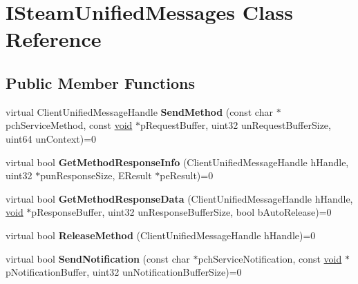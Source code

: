 \hypertarget{classISteamUnifiedMessages}{}\section{I\+Steam\+Unified\+Messages Class Reference}
\label{classISteamUnifiedMessages}
\subsection*{Public Member Functions}
\begin{DoxyCompactItemize}
\item 
\hypertarget{classISteamUnifiedMessages_a555de624350230b3293e707b2ec2a3c7}{}virtual Client\+Unified\+Message\+Handle {\bfseries Send\+Method} (const char $\ast$pch\+Service\+Method, const \hyperlink{SDL__audio_8h_a52835ae37c4bb905b903cbaf5d04b05f}{void} $\ast$p\+Request\+Buffer, uint32 un\+Request\+Buffer\+Size, uint64 un\+Context)=0\label{classISteamUnifiedMessages_a555de624350230b3293e707b2ec2a3c7}

\item 
\hypertarget{classISteamUnifiedMessages_a7923af78997437cfe9f4d817e4202676}{}virtual bool {\bfseries Get\+Method\+Response\+Info} (Client\+Unified\+Message\+Handle h\+Handle, uint32 $\ast$pun\+Response\+Size, E\+Result $\ast$pe\+Result)=0\label{classISteamUnifiedMessages_a7923af78997437cfe9f4d817e4202676}

\item 
\hypertarget{classISteamUnifiedMessages_ac86c79fcd0b915c9c53e439465a01630}{}virtual bool {\bfseries Get\+Method\+Response\+Data} (Client\+Unified\+Message\+Handle h\+Handle, \hyperlink{SDL__audio_8h_a52835ae37c4bb905b903cbaf5d04b05f}{void} $\ast$p\+Response\+Buffer, uint32 un\+Response\+Buffer\+Size, bool b\+Auto\+Release)=0\label{classISteamUnifiedMessages_ac86c79fcd0b915c9c53e439465a01630}

\item 
\hypertarget{classISteamUnifiedMessages_ac421c5bede8ca1584edb180f847efe48}{}virtual bool {\bfseries Release\+Method} (Client\+Unified\+Message\+Handle h\+Handle)=0\label{classISteamUnifiedMessages_ac421c5bede8ca1584edb180f847efe48}

\item 
\hypertarget{classISteamUnifiedMessages_a5ae1153298d137900122426dbaad1d98}{}virtual bool {\bfseries Send\+Notification} (const char $\ast$pch\+Service\+Notification, const \hyperlink{SDL__audio_8h_a52835ae37c4bb905b903cbaf5d04b05f}{void} $\ast$p\+Notification\+Buffer, uint32 un\+Notification\+Buffer\+Size)=0\label{classISteamUnifiedMessages_a5ae1153298d137900122426dbaad1d98}

\end{DoxyCompactItemize}
